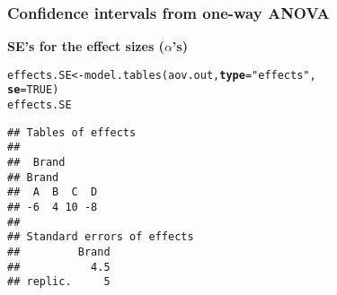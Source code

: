 \documentclass[color=usenames,dvipsnames]{beamer}\usepackage[]{graphicx}\usepackage[]{color}
\makeatletter
\newcommand{\hlnum}[1]{\textcolor[rgb]{0.69,0.494,0}{#1}}%
\newcommand{\hlstr}[1]{\textcolor[rgb]{0.749,0.012,0.012}{#1}}%
\newcommand{\hlstd}[1]{\textcolor[rgb]{0,0,0}{#1}}%
\newcommand{\hlkwb}[1]{\textcolor[rgb]{0,0.341,0.682}{#1}}%
\newcommand{\hlkwc}[1]{\textcolor[rgb]{0,0,0}{\textbf{#1}}}%
\newcommand{\hlkwd}[1]{\textcolor[rgb]{0.004,0.004,0.506}{#1}}%
\newenvironment{kframe}{%
 \def\at@end@of@kframe{}%
 \ifinner\ifhmode%
  \def\at@end@of@kframe{\end{minipage}}%
  \begin{minipage}{\columnwidth}%
 \fi\fi%
 \def\FrameCommand##1{\hskip\@totalleftmargin \hskip-\fboxsep
 \colorbox{shadecolor}{##1}\hskip-\fboxsep
     \hskip-\linewidth \hskip-\@totalleftmargin \hskip\columnwidth}%
 \MakeFramed {\advance\hsize-\width
   \@totalleftmargin\z@ \linewidth\hsize
   \@setminipage}}%
 {\par\unskip\endMakeFramed%
 \at@end@of@kframe}
\newenvironment{knitrout}{}{} %
\makeatother
\begin{document}
\begin{frame}[fragile]
  \frametitle{Confidence intervals from one-way ANOVA}
  \small %
  {\bf SE's for the effect sizes ($\alpha$'s)}
\begin{knitrout}
\color{fgcolor}\begin{kframe}
\begin{alltt}
\hlstd{effects.SE} \hlkwb{<-} \hlkwd{model.tables}\hlstd{(aov.out,} \hlkwc{type}\hlstd{=}\hlstr{"effects"}\hlstd{,}
                           \hlkwc{se}\hlstd{=}\hlnum{TRUE}\hlstd{)}
\hlstd{effects.SE}
\end{alltt}
\begin{verbatim}
## Tables of effects
## 
##  Brand 
## Brand
##  A  B  C  D 
## -6  4 10 -8 
## 
## Standard errors of effects
##         Brand
##           4.5
## replic.     5
\end{verbatim}
\end{kframe}
\end{knitrout}
\end{frame}
\end{document}
